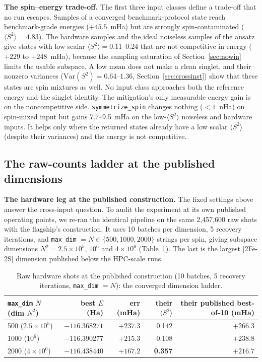 \documentclass[11pt]{article}
\newcommand{\ssq}{\ensuremath{\langle S^2\rangle}}
\begin{document}
\textbf{The spin--energy trade-off.} The first three input classes define a trade-off that no run escapes. Samples of a converged benchmark-protocol state reach benchmark-grade energies ($+45.5$~mHa) but are strongly spin-contaminated ($\ssq = 4.83$). The hardware samples and the ideal noiseless samples of the ansatz give states with low scalar $\ssq = 0.11$--$0.24$ that are not competitive in energy ($+229$ to $+248$~mHa), because the sampling saturation of Section~\ref{sec:nowin} limits the usable subspace. A low mean does not make a clean singlet, and their nonzero variances ($\mathrm{Var}(S^2) = 0.64$--$1.36$, Section~\ref{sec:crossinst}) show that these states are spin mixtures as well. No input class approaches both the reference energy and the singlet identity. The mitigation's only measurable energy gain is on the noncompetitive side. \texttt{symmetrize\_spin} changes nothing ($<1$~nHa) on spin-mixed input but gains 7.7--9.5~mHa on the low-$\ssq$ noiseless and hardware inputs. It helps only where the returned states already have a low scalar $\ssq$ (despite their variances) and the energy is not competitive.

\subsection{The raw-counts ladder at the published dimensions}\label{sec:rawladder}

\textbf{The hardware leg at the published construction.} The fixed settings above answer the cross-input question. To audit the experiment at its own published operating points, we re-ran the identical pipeline on the same 2{,}457{,}600 raw shots with the flagship's construction. It uses 10 batches per dimension, 5 recovery iterations, and \texttt{max\_dim} $= N \in \{500, 1000, 2000\}$ strings per spin, giving subspace dimensions $N^2 = 2.5\times10^5$, $10^6$ and $4\times10^6$ (Table~\ref{tab:rawladder}). The last is the largest [2Fe-2S] dimension published below the HPC-scale runs.

\begin{table}[ht]\centering\small
\caption{Raw hardware shots at the published construction (10 batches, 5 recovery iterations, \texttt{max\_dim} $=N$): the converged dimension ladder.}
\label{tab:rawladder}
\begin{tabular}{lrrrr}
\toprule
\texttt{max\_dim} $N$ (dim $N^2$) & best $E$ (Ha) & err (mHa) & their \ssq & their published best-of-10 (mHa) \\
\midrule
500 ($2.5\times10^5$) & $-116.368271$ & $+237.3$ & 0.142 & $+266.3$ \\
1000 ($10^6$) & $-116.390277$ & $+215.3$ & 0.108 & $+238.8$ \\
2000 ($4\times10^6$) & $-116.438440$ & $\mathbf{+167.2}$ & \textbf{0.357} & $+216.7$ \\
\bottomrule
\end{tabular}
\end{table}
\end{document}
